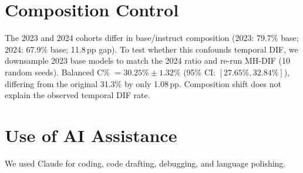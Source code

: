 \begin{table}[h]
\centering
\caption{Temporal DIF computed separately for base-only and instruct-only model subsets. Both model types independently exhibit C\% $\geq 32\%$, far exceeding the random baseline (0.62\%). Training methodology modulates DIF direction ($r$, focal-favoring proportion) rather than magnitude.}
\label{tab:baseinst_temporal}
\small
{}
\end{table}

\section{Composition Control}
\label{app:composition_control}

The 2023 and 2024 cohorts differ in base/instruct composition (2023: 79.7\% base; 2024: 67.9\% base; 11.8\,pp gap). To test whether this confounds temporal DIF, we downsample 2023 base models to match the 2024 ratio and re-run MH-DIF (10 random seeds). Balanced C\% $= 30.25\% \pm 1.32\%$ (95\% CI: $[27.65\%, 32.84\%]$), differing from the original 31.3\% by only 1.08\,pp. Composition shift does not explain the observed temporal DIF rate.

\section{Use of AI Assistance}

We used Claude for coding, code drafting, debugging, and language polishing.


